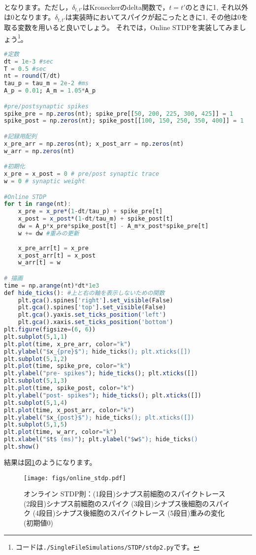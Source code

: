 となります。ただし，$\delta_{t,t'}$はKroneckerのdelta関数で，$t=t'$のときに1, それ以外は0となります。$\delta_{t,t'}$は実装時においてスパイクが起こったときに1, その他は0を取る変数を用いると良いでしょう。
それでは，Online STDPを実装してみましょう\footnote{コードは\texttt{./SingleFileSimulations/STDP/stdp2.py}です。}。
\begin{lstlisting}[language=julia]
#定数
dt = 1e-3 #sec
T = 0.5 #sec
nt = round(T/dt)
tau_p = tau_m = 2e-2 #ms
A_p = 0.01; A_m = 1.05*A_p

#pre/postsynaptic spikes
spike_pre = np.zeros(nt); spike_pre[[50, 200, 225, 300, 425]] = 1
spike_post = np.zeros(nt); spike_post[[100, 150, 250, 350, 400]] = 1

#記録用配列
x_pre_arr = np.zeros(nt); x_post_arr = np.zeros(nt)
w_arr = np.zeros(nt)

#初期化
x_pre = x_post = 0 # pre/post synaptic trace
w = 0 # synaptic weight

#Online STDP
for t in range(nt):
    x_pre = x_pre*(1-dt/tau_p) + spike_pre[t]
    x_post = x_post*(1-dt/tau_m) + spike_post[t]
    dw = A_p*x_pre*spike_post[t] - A_m*x_post*spike_pre[t]
    w += dw #重みの更新
    
    x_pre_arr[t] = x_pre
    x_post_arr[t] = x_post
    w_arr[t] = w

# 描画
time = np.arange(nt)*dt*1e3
def hide_ticks(): #上と右の軸を表示しないための関数
    plt.gca().spines['right'].set_visible(False)
    plt.gca().spines['top'].set_visible(False)
    plt.gca().yaxis.set_ticks_position('left')
    plt.gca().xaxis.set_ticks_position('bottom')
plt.figure(figsize=(6, 6))
plt.subplot(5,1,1)
plt.plot(time, x_pre_arr, color="k")
plt.ylabel("$x_{pre}$"); hide_ticks(); plt.xticks([])
plt.subplot(5,1,2)
plt.plot(time, spike_pre, color="k")
plt.ylabel("pre- spikes"); hide_ticks(); plt.xticks([])
plt.subplot(5,1,3)
plt.plot(time, spike_post, color="k")
plt.ylabel("post- spikes"); hide_ticks(); plt.xticks([])
plt.subplot(5,1,4)
plt.plot(time, x_post_arr, color="k")
plt.ylabel("$x_{post}$"); hide_ticks(); plt.xticks([])
plt.subplot(5,1,5)
plt.plot(time, w_arr, color="k")
plt.xlabel("$t$ (ms)"); plt.ylabel("$w$"); hide_ticks()
plt.show()
\end{lstlisting}
結果は図\ref{fig:online_stdp}のようになります。
\begin{figure}[htbp]
    \centering
    \texttt{[image: figs/online\_stdp.pdf]}
    \caption{オンライン STDP則：(1段目)シナプス前細胞のスパイクトレース (2段目)シナプス前細胞のスパイク (3段目)シナプス後細胞のスパイク (4段目)シナプス後細胞のスパイクトレース (5段目)重みの変化(初期値0)}
    \label{fig:online_stdp}
\end{figure}
